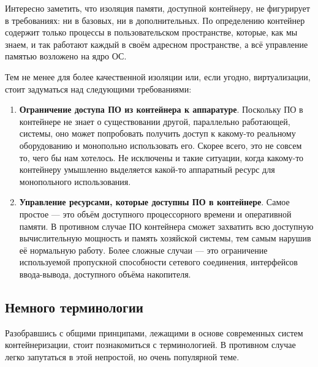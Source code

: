 \documentclass[14pt, a4paper]{article}
\begin{document}
Интересно заметить, что изоляция памяти, доступной контейнеру, не фигурирует в требованиях: ни в
базовых, ни в дополнительных. По определению контейнер содержит только процессы в
пользовательском пространстве, которые, как мы знаем, и так работают каждый в своём адресном
пространстве, а всё управление памятью возложено на ядро ОС.

Тем не менее для более качественной изоляции или, если угодно, виртуализации, стоит задуматься
над следующими требованиями:

\begin{enumerate}
    \item \textbf{Ограничение доступа ПО из контейнера к аппаратуре}. Поскольку ПО в контейнере не знает
    о существовании другой, параллельно работающей, системы, оно может попробовать
    получить доступ к какому-то реальному оборудованию и монопольно использовать его. Скорее
    всего, это не совсем то, чего бы нам хотелось. Не исключены и такие ситуации, когда
    какому-то контейнеру умышленно выделяется какой-то аппаратный ресурс для монопольного
    использования.
    \item \textbf{Управление ресурсами, которые доступны ПО в контейнере}. Самое простое — это объём
    доступного процессорного времени и оперативной памяти. В противном случае ПО
    контейнера сможет захватить всю доступную вычислительную мощность и память хозяйской
    системы, тем самым нарушив её нормальную работу. Более сложные случаи — это
    ограничение используемой пропускной способности сетевого соединения, интерфейсов
    ввода-вывода, доступного объёма накопителя.
\end{enumerate}

\subsection*{Немного терминологии}

Разобравшись с общими принципами, лежащими в основе современных систем контейнеризации,
стоит познакомиться с терминологией. В противном случае легко запутаться в этой непростой, но
очень популярной теме.
\end{document}
